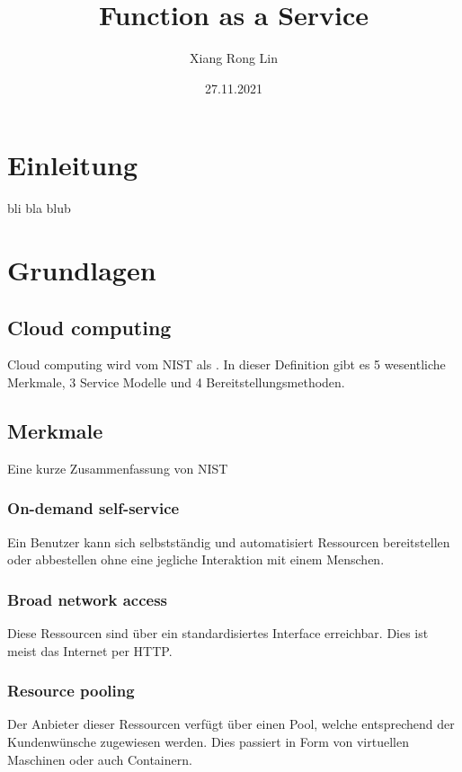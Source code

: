\documentclass[12pt, a4paper]{article}
\title{Function as a Service}
\author{Xiang Rong Lin}
\date{27.11.2021}
\begin{document}
\maketitle



\newpage
\tableofcontents

\newpage

\section{Einleitung}
bli bla blub

\section{Grundlagen}
\subsection{Cloud computing}
Cloud computing wird vom \ac{NIST} als \cite[ein Modell zur Ermöglichung eines allgegenwärtigen, bequemen und bedarfsgerechten Netzzugang zu einem gemeinsamen Pool konfigurierbarer Rechenressourcen die schnell bereitgestellt und freigegeben werden können mit minimalem Verwaltungsaufwand oder Interaktion mit dem Dienstanbieter]{mell2011nist}.
In dieser Definition gibt es 5 wesentliche Merkmale, 3 Service Modelle und 4 Bereitstellungsmethoden.

\subsection{Merkmale}
Eine kurze Zusammenfassung von \ac{NIST}\cite{mell2011nist}
\subsubsection{On-demand self-service}
Ein Benutzer kann sich selbstständig und automatisiert Ressourcen bereitstellen oder abbestellen ohne eine jegliche Interaktion mit einem Menschen. 

\subsubsection{Broad network access}
Diese Ressourcen sind über ein standardisiertes Interface erreichbar. Dies ist meist das Internet per HTTP.

\subsubsection{Resource pooling}
Der Anbieter dieser Ressourcen verfügt über einen Pool, welche entsprechend der Kundenwünsche zugewiesen werden. Dies passiert in Form von virtuellen Maschinen oder auch Containern.
\end{document}

